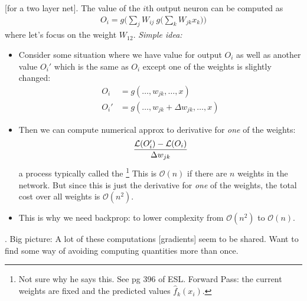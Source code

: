 \documentclass[12pt]{article}
\newcommand\p{\Needspace{10\baselineskip} \noindent}
\begin{document}
\p {} [for a two layer net]. The value of the $i$th output neuron can be computed as
	\begin{align}
		O_i = g\bigg(\sum_j W_{ij} ~ g\big( \sum_k W_{jk} x_k \big)\bigg)
	\end{align}
where let's focus on the weight $W_{12}$. \textit{Simple idea:}
\begin{itemize}
	\item Consider some situation where we have value for output $O_i$ as well as another value $O_i'$ which is the same as $O_i$ except one of the weights is slightly changed:
	\begin{align}
		O_i &= g(\ldots, w_{jk}, \ldots, x  ) \\
		O_i'&= g(\ldots, w_{jk} + \Delta w_{jk}, \ldots, x  ) 
	\end{align}
	
	\item Then we can compute numerical approx to derivative for \emph{one} of the weights:
	\begin{align}
		\dfrac{\mathcal{L}(O_i') - \mathcal{L}(O_i)}{ \Delta w_{jk} }
	\end{align}
	a process typically called the \footnote{Not sure why he says this. See pg 396 of ESL. Forward Pass: the current weights are fixed and the predicted values $\hat f_k(x_i)$.} This is $\mathcal{O}(n)$ if there are $n$ weights in the network. But since this is just the derivative for \emph{one} of the weights, the total cost over all weights is $\mathcal{O}(n^2)$. 
	\item This is why we need backprop: to lower complexity from $\mathcal{O}(n^2)$ to $\mathcal{O}(n)$.\\
\end{itemize}

\p {}. 	Big picture: A lot of these computations [gradients] seem to be shared. Want to find some way of avoiding computing quantities more than once. 
\end{document}
